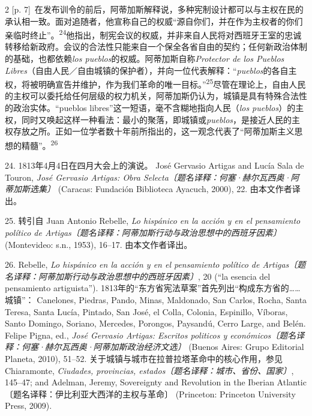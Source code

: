 \documentclass[10pt,a4paper]{article}
\begin{document}
\begin{paracol}{2}
{\scriptsize\color{gray} [p. 7]}\ 在发布训令的前后，阿蒂加斯解释说，多种宪制设计都可以与主权在民的承认相一致。面对追随者，他宣称自己的权威“源自你们，并在作为主权者的你们亲临时终止”。\nobreak\textsuperscript{24}他指出，制宪会议的权威，并非来自人民将对西班牙王室的忠诚转移给新政府。会议的合法性只能来自一个保全各省自由的契约；任何新政治体制的基础，也都依赖\textit{los pueblos}的权威。阿蒂加斯自称\textit{Protector de los Pueblos Libres}（自由人民／自由城镇的保护者），并向一位代表解释：“\textit{pueblos}的各自主权，将被明确宣告并维护，作为我们革命的唯一目标。”\nobreak\textsuperscript{25}尽管在理论上，自由人民的主权可以委托给任何层级的权力机关，阿蒂加斯仍认为，城镇是具有特殊合法性的政治实体。“pueblos libres”这一短语，毫不含糊地指向人民（\textit{los pueblos}）的主权，同时又唤起这样一种看法：最小的聚落，即城镇或\textit{pueblos}，是接近人民的主权存放之所。正如一位学者数十年前所指出的，这一观念代表了“阿蒂加斯主义思想的精髓”。\nobreak\textsuperscript{26}\par{\small 24. 1813年4月4日在四月大会上的演说。 José Gervasio Artigas and Lucía Sala de Touron, \textit{José Gervasio Artigas: Obra Selecta〔题名译释：何塞·赫尔瓦西奥·阿蒂加斯选集〕} (Caracas: Fundación Biblioteca Ayacuch, 2000), 22. 由本文作者译出。\par}{\small 25. 转引自 Juan Antonio Rebelle, \textit{Lo hispánico en la acción y en el pensamiento político de Artigas〔题名译释：阿蒂加斯行动与政治思想中的西班牙因素〕} (Montevideo: s.n., 1953), 16–17. 由本文作者译出。\par}{\small 26. Rebelle, \textit{Lo hispánico en la acción y en el pensamiento político de Artigas〔题名译释：阿蒂加斯行动与政治思想中的西班牙因素〕}, 20 (“la esencia del pensamiento artiguista”). 1813年的“东方省宪法草案”首先列出“构成东方省的……城镇”： Canelones, Piedras, Pando, Minas, Maldonado, San Carlos, Rocha, Santa Teresa, Santa Lucía, Pintado, San José, el Colla, Colonia, Espinillo, Víboras, Santo Domingo, Soriano, Mercedes, Porongos, Paysandú, Cerro Large, and Belén. Felipe Pigna, ed., \textit{José Gervasio Artigas: Escritos politicos y económicos〔题名译释：何塞·赫尔瓦西奥·阿蒂加斯政治经济文选〕} (Buenos Aires: Grupo Editorial Planeta, 2010), 51–52. 关于城镇与城市在拉普拉塔革命中的核心作用，参见 Chiaramonte, \textit{Ciudades, provincias, estados〔题名译释：城市、省份、国家〕}, 145–47; and Adelman, Jeremy, Sovereignty and Revolution in the Iberian Atlantic〔题名译释：伊比利亚大西洋的主权与革命〕 (Princeton: Princeton University Press, 2009).\par}
\switchcolumn

\end{paracol}
\end{document}
